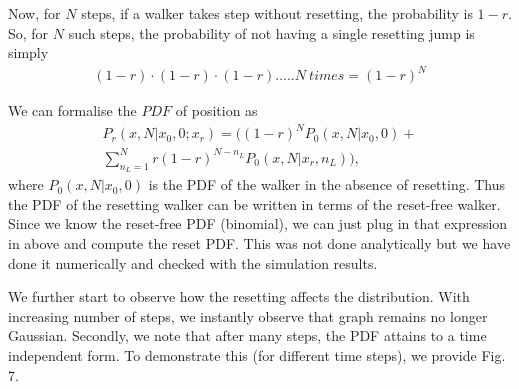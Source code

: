 \documentclass[showpacs,amsmath,amssymb,aps,pre,twocolumn]{revtex4-1}
\begin{document}

Now, for $N$ steps, if a walker takes step without resetting, the probability is $1-r$. 
So, for $N$ such steps, the probability of not having a single resetting jump is simply 
\begin{align}
    (1-r)\cdot (1-r) \cdot(1-r)..... N \ times = (1-r)^N
\end{align}

We can formalise the $PDF$ of position as 
\begin{align}
    P_r(x,N|x_0,0;x_r) = \bigg( 
    (1-r)^N P_0(x,N|x_0,0) + \\
    \sum^{N}_{n_L = 1} r (1-r)^{N-n_L} P_0(x,N|x_r, n_L)
    \bigg),
\end{align}
where $P_0(x,N|x_0,0)$ is the PDF of the walker in the absence of resetting. Thus the PDF of the resetting walker can be written in terms of the reset-free walker. Since we know the reset-free PDF (binomial), we can just plug in that expression in above and compute the reset PDF. This was not done analytically but we have done it numerically and checked with the simulation results.

We further start to observe how the resetting affects the distribution. With increasing number of steps, we instantly observe that graph remains no longer Gaussian. %
Secondly, we note that after many steps, the PDF attains to a time independent form. To demonstrate this (for different time steps), we provide Fig. 7.
\end{document}
